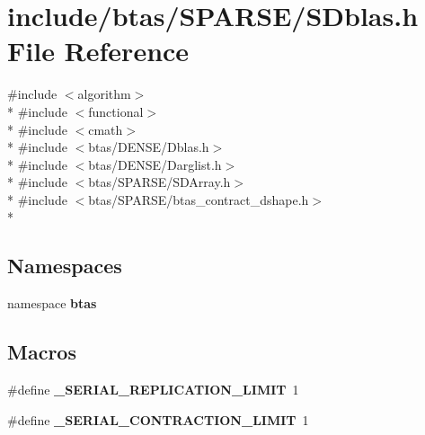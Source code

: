 \section{include/btas/\-S\-P\-A\-R\-S\-E/\-S\-Dblas.h File Reference}
\label{d6/de7/SDblas_8h}
{\ttfamily \#include $<$algorithm$>$}\\*
{\ttfamily \#include $<$functional$>$}\\*
{\ttfamily \#include $<$cmath$>$}\\*
{\ttfamily \#include $<$btas/\-D\-E\-N\-S\-E/\-Dblas.\-h$>$}\\*
{\ttfamily \#include $<$btas/\-D\-E\-N\-S\-E/\-Darglist.\-h$>$}\\*
{\ttfamily \#include $<$btas/\-S\-P\-A\-R\-S\-E/\-S\-D\-Array.\-h$>$}\\*
{\ttfamily \#include $<$btas/\-S\-P\-A\-R\-S\-E/btas\-\_\-contract\-\_\-dshape.\-h$>$}\\*
\subsection*{Namespaces}
\begin{DoxyCompactItemize}
\item 
namespace {\bf btas}
\end{DoxyCompactItemize}
\subsection*{Macros}
\begin{DoxyCompactItemize}
\item 
\#define {\bf \-\_\-\-S\-E\-R\-I\-A\-L\-\_\-\-R\-E\-P\-L\-I\-C\-A\-T\-I\-O\-N\-\_\-\-L\-I\-M\-I\-T}~1
\item 
\#define {\bf \-\_\-\-S\-E\-R\-I\-A\-L\-\_\-\-C\-O\-N\-T\-R\-A\-C\-T\-I\-O\-N\-\_\-\-L\-I\-M\-I\-T}~1
\end{DoxyCompactItemize}
